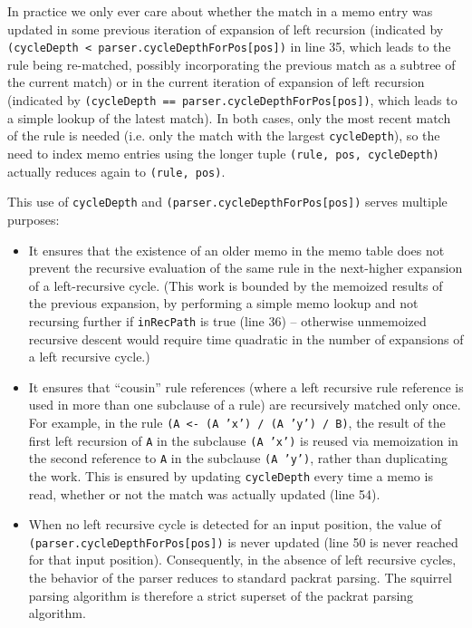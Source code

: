 \documentclass[manuscript]{acmart}
\begin{document}
In practice we only ever care about whether the match in a memo entry was updated in some previous iteration of expansion of left recursion (indicated by \texttt{(cycleDepth < parser.cycleDepthForPos[pos])} in line 35, which leads to the rule being re-matched, possibly incorporating the previous match as a subtree of the current match) or in the current iteration of expansion of left recursion (indicated by \texttt{(cycleDepth == parser.cycleDepthForPos[pos])}, which leads to a simple lookup of the latest match). In both cases, only the most recent match of the rule is needed (i.e. only the match with the largest \texttt{cycleDepth}), so the need to index memo entries using the longer tuple \texttt{(rule, pos, cycleDepth)} actually reduces again to \texttt{(rule, pos)}.

This use of \texttt{cycleDepth} and \texttt{(parser.cycleDepthForPos[pos])} serves multiple purposes:

\begin{itemize}
    \item It ensures that the existence of an older memo in the memo table does not prevent the recursive evaluation of the same rule in the next-higher expansion of a left-recursive cycle. (This work is bounded by the memoized results of the previous expansion, by performing a simple memo lookup and not recursing further if \texttt{inRecPath} is true (line 36) -- otherwise unmemoized recursive descent would require time quadratic in the number of expansions of a left recursive cycle.)
    
    \item It ensures that ``cousin'' rule references (where a left recursive rule reference is used in more than one subclause of a rule) are recursively matched only once. For example, in the rule \texttt{(A <- (A 'x') / (A 'y') / B)}, the result of the first left recursion of \texttt{A} in the subclause \texttt{(A 'x')} is reused via memoization in the second reference to \texttt{A} in the subclause \texttt{(A 'y')}, rather than duplicating the work. This is ensured by updating \texttt{cycleDepth} every time a memo is read, whether or not the match was actually updated (line 54).
    
    \item When no left recursive cycle is detected for an input position, the value of  \texttt{(parser.cycleDepthForPos[pos])} is never updated (line 50 is never reached for that input position). Consequently, in the absence of left recursive cycles, the behavior of the parser reduces to standard packrat parsing. The squirrel parsing algorithm is therefore a strict superset of the packrat parsing algorithm. 
\end{itemize}
\end{document}
